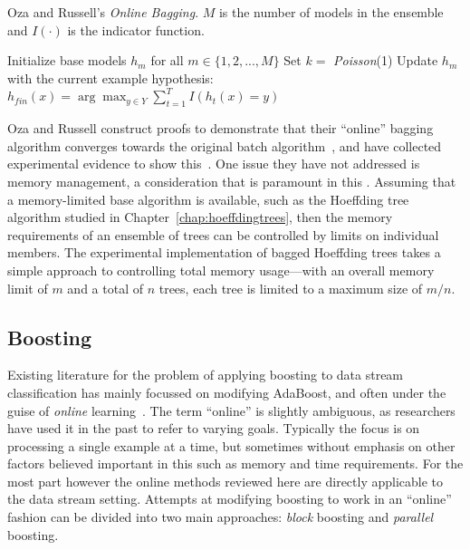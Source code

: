 \begin{algorithm}
\caption{Oza and Russell's {\em Online Bagging}. $M$ is the number of models in the ensemble and $I(\cdot)$ is the indicator function.}
\begin{algorithmic}[1]
\STATE Initialize base models $h_{m}$ for all $m \in \{1,2,...,M\}$
\STATE Set $k = $ {\em Poisson}(1)
\STATE Update $h_{m}$ with the current example
\ENDFOR
\ENDFOR
\ENDFOR
{}
\RETURN hypothesis: $h_{fin}(x) = \arg \max_{y \in Y} \sum_{t=1}^{T} I(h_{t}(x) = y)$
\end{algorithmic}
\label{alg:ozabag}
\end{algorithm}

Oza and Russell construct proofs to demonstrate that their ``online'' bagging algorithm converges towards the original batch algorithm~\cite{ozabagboost}, and have collected experimental evidence to show this~\cite{ozaexp}. One issue they have not addressed is memory management, a consideration that is paramount in this  \thesisc. Assuming that a memory-limited base algorithm is available, such as the Hoeffding tree algorithm studied in Chapter~\ref{chap:hoeffdingtrees}, then the memory requirements of an ensemble of trees can be controlled by limits on individual members. The experimental implementation of bagged Hoeffding trees takes a simple approach to controlling total memory usage---with an overall memory limit of $m$ and a total of $n$ trees, each tree is limited to a maximum size of $m/n$.


\subsection{Boosting} 
\label{sec:boostingstream}

Existing literature for the problem of applying boosting to data stream
classification has mainly focussed on modifying AdaBoost, and often under the guise of {\em online} learning~\cite{ozabagboost, fszboost}. 
The term ``online'' is slightly ambiguous, as researchers have used it in the past to refer to varying goals. Typically the focus is on processing a single example at a time, but sometimes without emphasis on other factors believed important in this \thesis  such as memory and time requirements.
For the most part however the online methods reviewed here are directly applicable to the data stream setting.
Attempts at modifying boosting to work in an ``online'' fashion can be
divided into two main approaches: {\em block} boosting and {\em parallel}
boosting.

